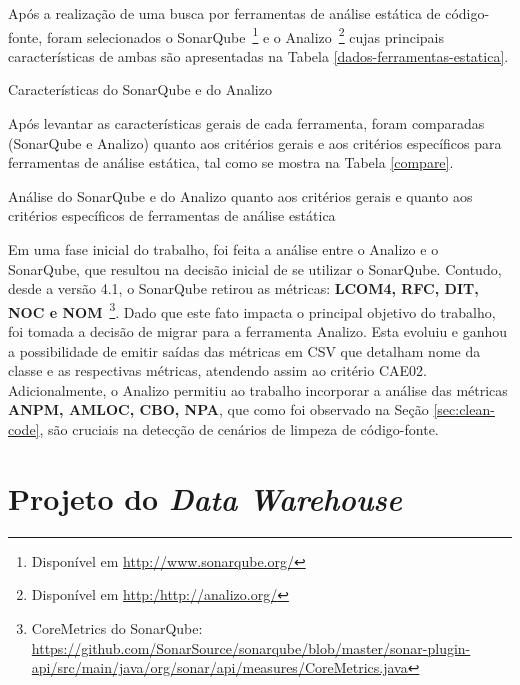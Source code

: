 Após a realização de uma busca por ferramentas de análise estática de código-fonte, foram selecionados o SonarQube~\footnote{Disponível em \url{http://www.sonarqube.org/}} e o Analizo~\footnote{Disponível em \url{http:/http://analizo.org/}} cujas principais características de ambas são apresentadas na Tabela \ref{dados-ferramentas-estatica}.

\begin{savenotes}
\begin{table}[!ht]
\centering

\caption{Características do SonarQube e do Analizo}
\label{dados-ferramentas-estatica}
\end{table}
\FloatBarrier
\end{savenotes}

Após levantar as características gerais de cada ferramenta, foram comparadas (SonarQube e Analizo) quanto aos critérios gerais e aos critérios específicos para ferramentas de análise estática, tal como se mostra na Tabela \ref{compare}.


\begin{table}[!ht]
\centering

\caption{Análise do SonarQube e do Analizo quanto aos critérios gerais e quanto aos critérios específicos de ferramentas de análise estática}
\label{compare}
\end{table}
\FloatBarrier

Em uma fase inicial do trabalho, foi feita a análise entre o Analizo e o SonarQube, que resultou na decisão inicial de se utilizar o SonarQube. Contudo, desde a versão 4.1, o SonarQube retirou as métricas: \textbf{LCOM4, RFC, DIT, NOC e NOM}~\footnote{CoreMetrics do SonarQube: \url{https://github.com/SonarSource/sonarqube/blob/master/sonar-plugin-api/src/main/java/org/sonar/api/measures/CoreMetrics.java}}. Dado que este fato impacta o principal objetivo do trabalho, foi tomada a decisão de migrar para a ferramenta Analizo. Esta evoluiu e ganhou a possibilidade de emitir saídas das métricas em CSV que detalham nome da classe e as respectivas métricas, atendendo assim ao critério CAE02. Adicionalmente, o Analizo permitiu ao trabalho incorporar a análise das métricas \textbf{ANPM, AMLOC, CBO, NPA}, que como foi observado na Seção \ref{sec:clean-code}, são cruciais na detecção de cenários de limpeza de código-fonte.

\section{Projeto do \textit{Data Warehouse}}
\label{sec:project-dw}

